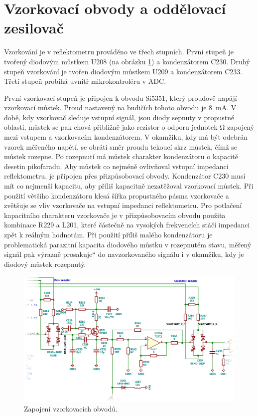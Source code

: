 \section{Vzorkovací obvody a oddělovací zesilovač}
Vzorkování je v reflektometru prováděno ve třech stupních. První stupeň je tvořený diodovým můstkem U208 (na obrázku \ref{sampler_section_schematic}) a kondenzátorem C230. Druhý stupeň vzorkování je tvořen diodovým můstkem U209 a kondenzátorem C233. Třetí stupeň probíhá uvnitř mikrokontroléru v \acrshort{ADC}.

První vzorkovací stupeň je připojen k obvodu Si5351, který proudově napájí vzorkovací můstek. Proud nastavený na budičích tohoto obvodu je \SI{8}{\milli\ampere}. V době, kdy vzorkovač sleduje vstupní signál, jsou diody sepnuty v propustné oblasti, můstek se pak chová přibližně jako rezistor o odporu jednotek \si{\ohm} zapojený mezi vstupem a vzorkovacím kondenzátorem. V okamžiku, kdy má být odebrán vzorek měřeného napětí, se obrátí směr proudu tekoucí skrz můstek, čímž se můstek rozepne. Po rozepnutí má můstek charakter kondenzátoru o kapacitě desetin pikofaradu. Aby můstek co nejméně ovlivňoval vstupní impedanci reflektometru, je připojen přes přizpůsobovací obvody. Kondenzátor C230 musí mít co nejmenší kapacitu, aby příliš kapacitně nezatěžoval vzorkovací můstek. Při použití většího kondenzátoru klesá šířka propustného pásma vzorkovače a zvětšuje se vliv vzorkovače na vstupní impedanci reflektometru. Pro potlačení kapacitního charakteru vzorkovače je v přizpůsobovacím obvodu použita kombinace R229 a L201, které částečně na vysokých frekvencích stáčí impedanci zpět k reálným hodnotám. Při použití příliš malého kondenzátoru je problematická parazitní kapacita diodového můstku v rozepnutém stavu, měřený signál pak výrazně \quotedblbase prosakuje\textquotedblleft{} do navzorkovaného signálu i v okamžiku, kdy je diodový můstek rozepnutý.

\begin{figure}[htbp]
\includegraphics[width=\textwidth,keepaspectratio]{images/sampler_section.eps}\caption{Zapojení vzorkovacích obvodů.}\label{sampler_section_schematic}
\end{figure}

